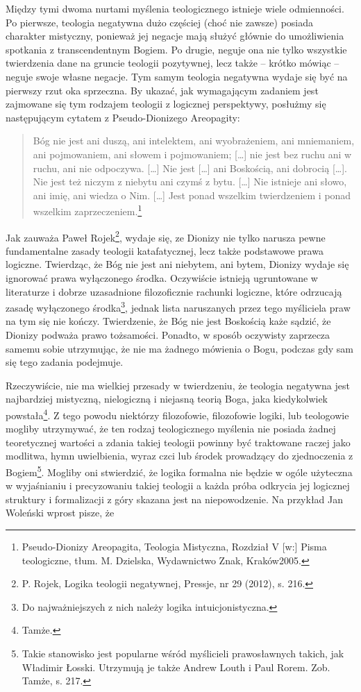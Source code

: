 Między tymi dwoma nurtami myślenia teologicznego istnieje wiele
odmienności. Po pierwsze, teologia negatywna dużo częściej (choć nie
zawsze) posiada charakter mistyczny, ponieważ jej negacje mają służyć
głównie do umożliwienia spotkania z transcendentnym Bogiem. Po drugie,
neguje ona nie tylko wszystkie twierdzenia dane na gruncie teologii
pozytywnej, lecz także -- krótko mówiąc -- neguje swoje własne negacje.
Tym samym teologia negatywna wydaje się być na pierwszy rzut oka
sprzeczna. By ukazać, jak wymagającym zadaniem jest zajmowane się tym
rodzajem teologii z logicznej perspektywy, posłużmy się następującym
cytatem z Pseudo-Dionizego Areopagity:




\begin{quote}
    Bóg nie jest ani duszą, ani intelektem, ani wyobrażeniem, ani
mniemaniem, ani pojmowaniem, ani słowem i pojmowaniem; […] nie jest bez
ruchu ani w ruchu, ani nie odpoczywa. […] Nie jest […] ani Boskością,
ani dobrocią […]. Nie jest też niczym z niebytu ani czymś z bytu. […]
Nie istnieje ani słowo, ani imię, ani wiedza o Nim. […] Jest ponad
wszelkim twierdzeniem i ponad wszelkim zaprzeczeniem.\footnote{
Pseudo-Dionizy Areopagita, Teologia Mistyczna, Rozdział V [w:]  Pisma
teologiczne, tłum. M. Dzielska, Wydawnictwo Znak, Kraków2005.}
\end{quote}



Jak zauważa Paweł Rojek\footnote{P. Rojek, Logika teologii negatywnej,
Pressje, nr 29 (2012), s. 216. }, wydaje się, ze Dionizy nie tylko
narusza pewne fundamentalne zasady teologii katafatycznej, lecz także
podstawowe prawa logiczne. Twierdząc, że Bóg nie jest ani niebytem, ani
bytem, Dionizy wydaje się ignorować prawa wyłączonego środka.
Oczywiście istnieją ugruntowane w literaturze i dobrze uzasadnione
filozoficznie rachunki logiczne, które odrzucają zasadę wyłączonego
środka\footnote{Do najważniejszych z nich należy logika
intuicjonistyczna. }, jednak lista naruszanych przez tego
myśliciela praw na tym się nie kończy. Twierdzenie, że Bóg nie jest
Boskością każe sądzić, że Dionizy podważa prawo tożsamości. Ponadto, w
sposób oczywisty zaprzecza samemu sobie utrzymując, że nie ma żadnego
mówienia o Bogu, podczas gdy sam się tego zadania podejmuje.

Rzeczywiście, nie ma wielkiej przesady w twierdzeniu, że teologia
negatywna jest najbardziej mistyczną, nielogiczną i niejasną teorią
Boga, jaka kiedykolwiek powstała\footnote{Tamże. }. Z tego powodu
niektórzy filozofowie, filozofowie logiki, lub teologowie mogliby
utrzymywać, że ten rodzaj teologicznego myślenia nie posiada żadnej
teoretycznej wartości a zdania takiej teologii powinny być traktowane
raczej jako modlitwa, hymn uwielbienia, wyraz czci lub środek
prowadzący do zjednoczenia z Bogiem\footnote{Takie stanowisko jest
popularne wśród myślicieli prawosławnych takich, jak Władimir Łosski.
Utrzymują je także Andrew Louth i Paul Rorem. Zob. Tamże, s. 217.
}. Mogliby oni stwierdzić, że logika formalna nie będzie w ogóle
użyteczna w wyjaśnianiu i precyzowaniu takiej teologii a każda próba
odkrycia jej logicznej struktury i formalizacji z góry skazana jest na
niepowodzenie. Na przykład Jan Woleński wprost pisze, że




